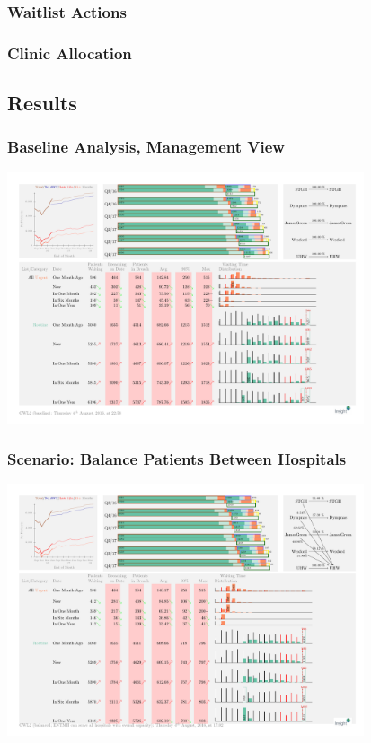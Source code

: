 \begin{frame}
\frametitle{Waitlist Actions}

\end{frame}

\begin{frame}
\frametitle{Clinic Allocation}

\end{frame}

\subsection{Results}
\begin{frame}
\frametitle{Baseline Analysis, Management View}
\includegraphics[width=10.5cm]{imagesoutpatient/baseline}
\end{frame}

\begin{frame}
\frametitle{Scenario: Balance Patients Between Hospitals}
\includegraphics[width=10.5cm]{imagesoutpatient/balanced}
\end{frame}

